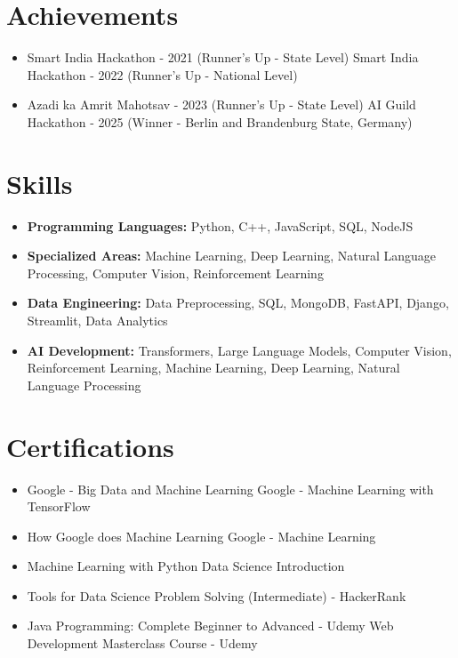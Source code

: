 \documentclass[a4paper,10pt]{article}
\begin{document}
\section*{Achievements}
\begin{itemize}
\item Smart India Hackathon - 2021 (Runner's Up - State Level) \hfill Smart India Hackathon - 2022 (Runner's Up - National Level)
\item Azadi ka Amrit Mahotsav - 2023 (Runner's Up - State Level) \hfill AI Guild Hackathon - 2025 (Winner - Berlin and Brandenburg State, Germany)
\end{itemize}

\section*{Skills}
\begin{itemize}
  \item \textbf{Programming Languages:} Python, C++, JavaScript, SQL, NodeJS
  \item \textbf{Specialized Areas:} Machine Learning, Deep Learning, Natural Language Processing, Computer Vision, Reinforcement Learning
  \item \textbf{Data Engineering:} Data Preprocessing, SQL, MongoDB, FastAPI, Django, Streamlit, Data Analytics
  \item \textbf{AI Development:} Transformers, Large Language Models, Computer Vision, Reinforcement Learning, Machine Learning, Deep Learning, Natural Language Processing
\end{itemize}

\section*{Certifications}
\begin{itemize}
\item Google - Big Data and Machine Learning \hfill Google - Machine Learning with TensorFlow
\item How Google does Machine Learning \hfill Google - Machine Learning
\item Machine Learning with Python \hfill Data Science Introduction
\item Tools for Data Science \hfill Problem Solving (Intermediate) - HackerRank
\item Java Programming: Complete Beginner to Advanced - Udemy \hfill Web Development Masterclass Course - Udemy
\end{itemize}
\end{document}
